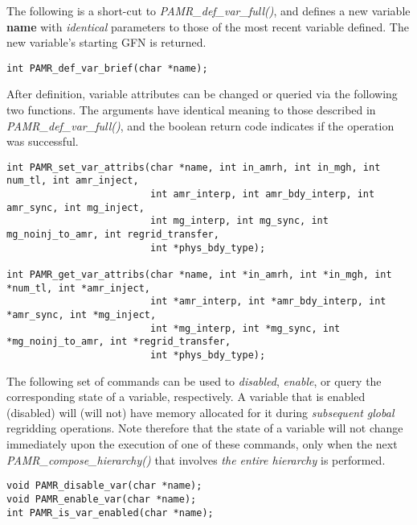 \documentclass[aps,amssymb,unsortedaddress,nofootinbib]{revtex4}
\begin{document}

\noindent 
The following is a short-cut to {\em PAMR\_def\_var\_full()}, and defines a new
variable {\bf name} with {\em identical} parameters to those of the
most recent variable defined. The new variable's starting GFN is returned.

\begin{verbatim}
int PAMR_def_var_brief(char *name);
\end{verbatim}


\noindent
After definition, variable attributes can be changed or queried via the following
two functions. The arguments have identical meaning to those described in 
{\em PAMR\_def\_var\_full()}, and the boolean return code indicates if the operation 
was successful.

\begin{verbatim}
int PAMR_set_var_attribs(char *name, int in_amrh, int in_mgh, int num_tl, int amr_inject,
                         int amr_interp, int amr_bdy_interp, int amr_sync, int mg_inject, 
                         int mg_interp, int mg_sync, int mg_noinj_to_amr, int regrid_transfer, 
                         int *phys_bdy_type);
                         
int PAMR_get_var_attribs(char *name, int *in_amrh, int *in_mgh, int *num_tl, int *amr_inject,
                         int *amr_interp, int *amr_bdy_interp, int *amr_sync, int *mg_inject, 
                         int *mg_interp, int *mg_sync, int *mg_noinj_to_amr, int *regrid_transfer, 
                         int *phys_bdy_type);
\end{verbatim}


\noindent
The following set of commands can be used to {\em disabled}, {\em enable}, or 
query the corresponding state of a variable, respectively. A variable that is
enabled (disabled) will (will not) have memory allocated for it during 
{\em subsequent global} regridding operations. 
Note therefore that the state of a variable will not change 
immediately upon the execution of one of these commands, only when the 
next {\em PAMR\_compose\_hierarchy()} that 
involves {\em the entire hierarchy} is performed.

\begin{verbatim}
void PAMR_disable_var(char *name);
void PAMR_enable_var(char *name);
int PAMR_is_var_enabled(char *name);
\end{verbatim}
\end{document}
